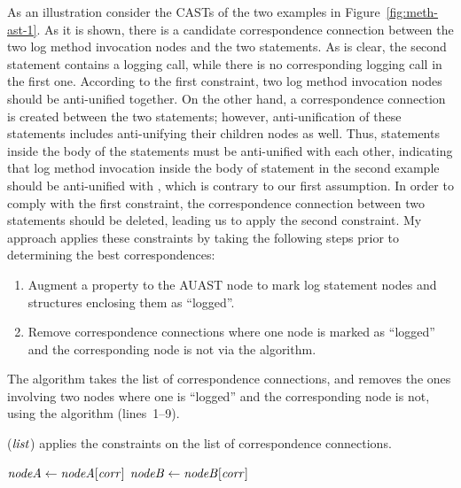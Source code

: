 As an illustration consider the CASTs of the two examples in Figure~\ref{fig:meth-ast-1}. As it is shown, there is a candidate correspondence connection between the two log method invocation nodes and the two  statements. As is clear, the second  statement contains a logging call, while there is no corresponding logging call in the first one. According to the first constraint, two log method invocation nodes should be anti-unified together. On the other hand, a correspondence connection is created between the two  statements; however, anti-unification of these statements includes anti-unifying their children nodes as well. Thus, statements inside the body of the  statements must be anti-unified with each other, indicating that log method invocation inside the body of  statement in the second example should be anti-unified with \nothing, which is contrary to our first assumption. In order to comply with the first constraint, the correspondence connection between two  statements should be deleted, leading us to apply the second constraint. My approach applies these constraints by taking the following steps prior to determining the best correspondences:
\begin{enumerate} [leftmargin=.4in]
\item	Augment a property to the AUAST node to mark log statement nodes and structures enclosing them as ``logged''.
\item	Remove correspondence connections where one node is marked as ``logged'' and the corresponding node is not via the  algorithm.
\end{enumerate}

The  algorithm takes the list of correspondence connections, and removes the ones involving two nodes where one is ``logged'' and the corresponding node is not, using the  algorithm (lines~1--9).

\begin{algorithm}
  \caption{($\mathit{list}$) applies the constraints on the list of correspondence connections.}
  \label{computeMatches}
  \begin{algorithmic}[1]
  \ApplyConstraints
      \State $\mathit{nodeA} \gets \mathit{nodeA}[\mathit{corr}]$
	  \State $\mathit{nodeB} \gets \mathit{nodeB}[\mathit{corr}]$
	  \EndIf 		
 \EndFor 	
	
  \end{algorithmic}
\end{algorithm}




